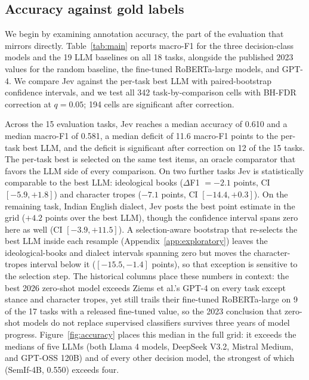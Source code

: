 \documentclass[11pt]{article}
\begin{document}
\subsection{Accuracy against gold labels}

We begin by examining annotation accuracy, the part of the evaluation that mirrors \citet{ziems2024llms} directly. Table~\ref{tab:main} reports macro-F1 for the three decision-class models and the 19 LLM baselines on all 18 tasks, alongside the published 2023 values for the random baseline, the fine-tuned RoBERTa-large models, and GPT-4. We compare Jev against the per-task best LLM with paired-bootstrap confidence intervals, and we test all 342 task-by-comparison cells with BH-FDR correction at $q = 0.05$; 194 cells are significant after correction.

Across the 15 evaluation tasks, Jev reaches a median accuracy of 0.610 and a median macro-F1 of 0.581, a median deficit of 11.6 macro-F1 points to the per-task best LLM, and the deficit is significant after correction on 12 of the 15 tasks. The per-task best is selected on the same test items, an oracle comparator that favors the LLM side of every comparison. On two further tasks Jev is statistically comparable to the best LLM: ideological books ($\Delta$F1 $= -2.1$ points, CI $[-5.9, +1.8]$) and character tropes ($-7.1$ points, CI $[-14.4, +0.3]$). On the remaining task, Indian English dialect, Jev posts the best point estimate in the grid ($+4.2$ points over the best LLM), though the confidence interval spans zero here as well (CI $[-3.9, +11.5]$). A selection-aware bootstrap that re-selects the best LLM inside each resample (Appendix~\ref{app:exploratory}) leaves the ideological-books and dialect intervals spanning zero but moves the character-tropes interval below it ($[-15.5, -1.4]$ points), so that exception is sensitive to the selection step. The historical columns place these numbers in context: the best 2026 zero-shot model exceeds Ziems et al.'s GPT-4 on every task except stance and character tropes, yet still trails their fine-tuned RoBERTa-large on 9 of the 17 tasks with a released fine-tuned value, so the 2023 conclusion that zero-shot models do not replace supervised classifiers survives three years of model progress. Figure~\ref{fig:accuracy} places this median in the full grid: it exceeds the medians of five LLMs (both Llama 4 models, DeepSeek V3.2, Mistral Medium, and GPT-OSS 120B) and of every other decision model, the strongest of which (SemIf-4B, 0.550) exceeds four.
\end{document}
